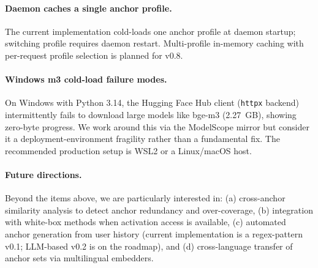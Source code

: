 \paragraph{Daemon caches a single anchor profile.} The current
implementation cold-loads one anchor profile at daemon startup;
switching profile requires daemon restart. Multi-profile in-memory
caching with per-request profile selection is planned for v0.8.

\paragraph{Windows m3 cold-load failure modes.} On Windows with
Python 3.14, the Hugging Face Hub client (\texttt{httpx} backend)
intermittently fails to download large models like bge-m3 (2.27~GB),
showing zero-byte progress. We work around this via the ModelScope
mirror but consider it a deployment-environment fragility rather
than a fundamental fix. The recommended production setup is WSL2 or
a Linux/macOS host.

\paragraph{Future directions.} Beyond the items above, we are
particularly interested in: (a) cross-anchor similarity analysis to
detect anchor redundancy and over-coverage, (b) integration with
white-box methods when activation access is available, (c)
automated anchor generation from user history (current implementation
is a regex-pattern v0.1; LLM-based v0.2 is on the roadmap), and
(d) cross-language transfer of anchor sets via multilingual
embedders.
